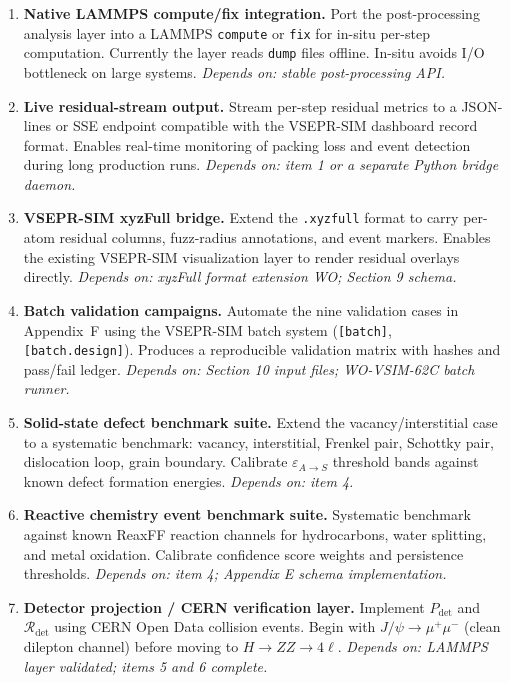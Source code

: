 \documentclass[11pt, a4paper, oneside]{article}
\begin{document}
\begin{enumerate}[leftmargin=2em]

  \item \textbf{Native LAMMPS compute/fix integration.}
	Port the post-processing analysis layer into a LAMMPS
	\texttt{compute} or \texttt{fix} for in-situ per-step computation.
	Currently the layer reads \texttt{dump} files offline.
	In-situ avoids I/O bottleneck on large systems.
	\textit{Depends on: stable post-processing API.}

  \item \textbf{Live residual-stream output.}
	Stream per-step residual metrics to a JSON-lines or SSE endpoint
	compatible with the VSEPR-SIM dashboard record format.
	Enables real-time monitoring of packing loss and event detection
	during long production runs.
	\textit{Depends on: item 1 or a separate Python bridge daemon.}

  \item \textbf{VSEPR-SIM xyzFull bridge.}
	Extend the \texttt{.xyzfull} format to carry per-atom
	residual columns, fuzz-radius annotations, and event markers.
	Enables the existing VSEPR-SIM visualization layer to render
	residual overlays directly.
	\textit{Depends on: xyzFull format extension WO; Section 9 schema.}

  \item \textbf{Batch validation campaigns.}
	Automate the nine validation cases in Appendix~F using the
	VSEPR-SIM batch system (\texttt{[batch]}, \texttt{[batch.design]}).
	Produces a reproducible validation matrix with hashes and
	pass/fail ledger.
	\textit{Depends on: Section 10 input files; WO-VSIM-62C batch runner.}

  \item \textbf{Solid-state defect benchmark suite.}
	Extend the vacancy/interstitial case to a systematic
	benchmark: vacancy, interstitial, Frenkel pair, Schottky pair,
	dislocation loop, grain boundary.
	Calibrate $\varepsilon_{A \to S}$ threshold bands against
	known defect formation energies.
	\textit{Depends on: item 4.}

  \item \textbf{Reactive chemistry event benchmark suite.}
	Systematic benchmark against known ReaxFF reaction channels for
	hydrocarbons, water splitting, and metal oxidation.
	Calibrate confidence score weights and persistence thresholds.
	\textit{Depends on: item 4; Appendix E schema implementation.}

  \item \textbf{Detector projection / CERN verification layer.}
	Implement $P_{\mathrm{det}}$ and $\mathcal{R}_{\mathrm{det}}$
	using CERN Open Data collision events.
	Begin with $J/\psi \to \mu^+\mu^-$ (clean dilepton channel)
	before moving to $H \to ZZ \to 4\ell$.
	\textit{Depends on: LAMMPS layer validated; items 5 and 6 complete.}


\end{enumerate}
\end{document}
